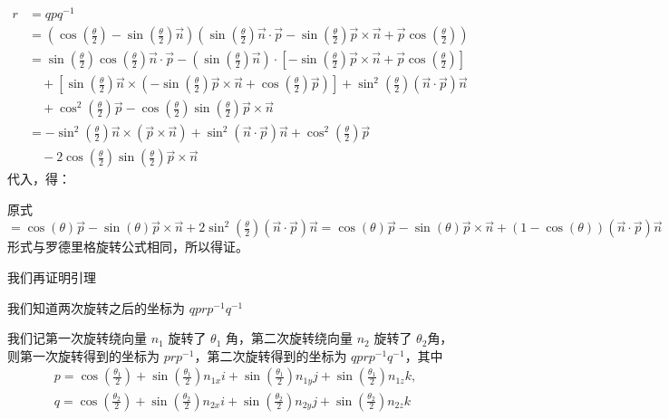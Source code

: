 \documentclass[withoutpreface,bwprint]{cumcmthesis} %
\begin{document}
\[
    \begin{split}
        r &= qpq^{-1} \\ &= (\cos(\frac{\theta}{2}) - 
        \sin(\frac{\theta}{2})\overrightarrow{n})
        (\sin(\frac{\theta}{2})\overrightarrow{n} \cdot \overrightarrow{p} -
        \sin(\frac{\theta}{2})\overrightarrow{p} \times \overrightarrow{n} +
        \overrightarrow{p}\cos(\frac{\theta}{2})) \\ &= \sin(\frac{\theta}{2})
        \cos(\frac{\theta}{2})\overrightarrow{n} \cdot \overrightarrow{p} -
        (\sin(\frac{\theta}{2})\overrightarrow{n}) \cdot
        [-\sin(\frac{\theta}{2})\overrightarrow{p} \times \overrightarrow{n} +
        \overrightarrow{p}\cos(\frac{\theta}{2})] \\ &\quad + 
        [\sin(\frac{\theta}{2})\overrightarrow{n} \times 
        (-\sin(\frac{\theta}{2})\overrightarrow{p} \times \overrightarrow{n} +
        \cos(\frac{\theta}{2})\overrightarrow{p})] + \sin ^2
        (\frac{\theta}{2})(\overrightarrow{n} \cdot \overrightarrow{p})
        \overrightarrow{n} \\ &\quad + \cos ^2(\frac{\theta}{2})\overrightarrow{p} -
        \cos(\frac{\theta}{2})\sin(\frac{\theta}{2})\overrightarrow{p} \times 
        \overrightarrow{n} \\ &= -\sin^2(\frac{\theta}{2})\overrightarrow{n} \times
        (\overrightarrow{p} \times \overrightarrow{n}) +
        \sin^2(\overrightarrow{n} \cdot \overrightarrow{p})\overrightarrow{n} +
        \cos^2(\frac{\theta}{2})\overrightarrow{p} \\ &\quad - 2\cos(\frac{\theta}{2})
        \sin(\frac{\theta}{2})\overrightarrow{p} \times \overrightarrow{n} 
    \end{split}
\]
\phantom{哈哈}代入，得：\par
原式 $= \cos(\theta)\overrightarrow{p} - \sin(\theta)\overrightarrow{p} \times
\overrightarrow{n} + 2\sin^2(\frac{\theta}{2})(\overrightarrow{n} \cdot 
\overrightarrow{p})\overrightarrow{n} = \cos(\theta)\overrightarrow{p} -
\sin(\theta)\overrightarrow{p} \times \overrightarrow{n} +
(1 - \cos(\theta ))(\overrightarrow{n} \cdot \overrightarrow{p})
\overrightarrow{n} $
形式与罗德里格旋转公式相同，所以得证。 \par
我们再证明引理 \par
我们知道两次旋转之后的坐标为 $qprp^{-1}q^{-1}$ \par
我们记第一次旋转绕向量 $n_1$ 旋转了 $\theta _1$ 角，第二次旋转绕向量 $n_2$ 旋转了 $\theta _2$角，
则第一次旋转得到的坐标为 $prp^{-1}$，第二次旋转得到的坐标为 $qprp^{-1}q^{-1}$，其中
\[
    \begin{split}
        p = \cos(\frac{\theta _1}{2}) + \sin(\frac{\theta _1}{2})n_{1x}i +
        \sin(\frac{\theta _1}{2})n_{1y}j + \sin(\frac{\theta _1}{2})n_{1z}k, \\
        q = \cos(\frac{\theta _2}{2}) + \sin(\frac{\theta _2}{2})n_{2x}i +
        \sin(\frac{\theta _2}{2})n_{2y}j + \sin(\frac{\theta _2}{2})n_{2z}k
    \end{split}
\]
\end{document}
